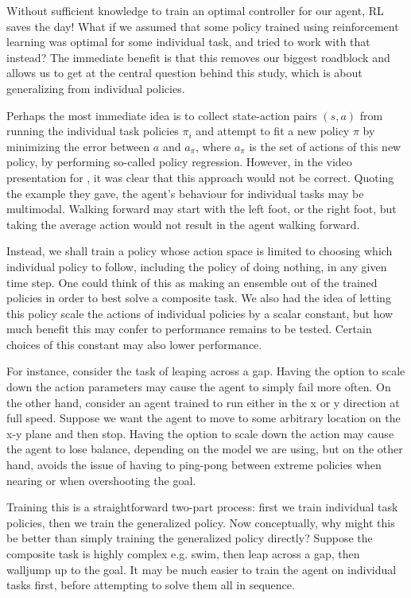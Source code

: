 \documentclass{article}
\begin{document}
Without sufficient knowledge to train an optimal controller for our agent, RL saves the day! What if we assumed that some policy trained using reinforcement learning was optimal for some individual task, and tried to work with that instead? The immediate benefit is that this removes our biggest roadblock and allows us to get at the central question behind this study, which is about generalizing from individual policies.

Perhaps the most immediate idea is to collect state-action pairs ${(s, a)}$ from running the individual task policies $\pi_i$ and attempt to fit a new policy $\pi$ by minimizing the error between $a$ and $a_\pi$, where $a_\pi$ is the set of actions of this new policy, by performing so-called policy regression. However, in the video presentation for \cite{mordatch2015interactive}, it was clear that this approach would not be correct. Quoting the example they gave, the agent's behaviour for individual tasks may be multimodal. Walking forward may start with the left foot, or the right foot, but taking the average action would not result in the agent walking forward.

Instead, we shall train a policy whose action space is limited to choosing which individual policy to follow, including the policy of doing nothing, in any given time step. One could think of this as making an ensemble out of the trained policies in order to best solve a composite task. We also had the idea of letting this policy scale the actions of individual policies by a scalar constant, but how much benefit this may confer to performance remains to be tested. Certain choices of this constant may also lower performance.

For instance, consider the task of leaping across a gap. Having the option to scale down the action parameters may cause the agent to simply fail more often. On the other hand, consider an agent trained to run either in the x or y direction at full speed. Suppose we want the agent to move to some arbitrary location on the x-y plane and then stop. Having the option to scale down the action may cause the agent to lose balance, depending on the model we are using, but on the other hand, avoids the issue of having to ping-pong between extreme policies when nearing or when overshooting the goal.

Training this is a straightforward two-part process: first we train individual task policies, then we train the generalized policy. Now conceptually, why might this be better than simply training the generalized policy directly? Suppose the composite task is highly complex e.g. swim, then leap across a gap, then walljump up to the goal. It may be much easier to train the agent on individual tasks first, before attempting to solve them all in sequence.
\end{document}
